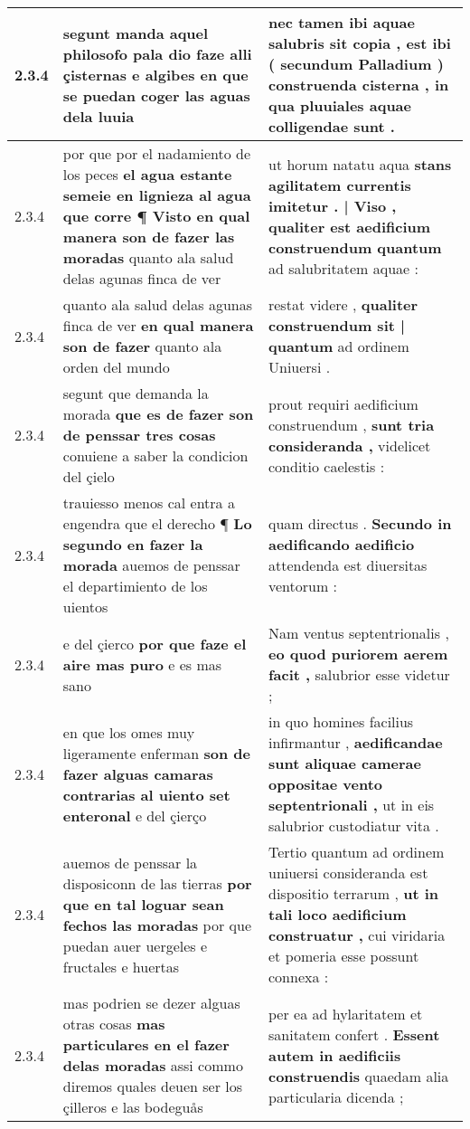 \begin{tabular}{|p{1cm}|p{6.5cm}|p{6.5cm}|}
2.3.4 & segunt manda aquel philosofo \textbf{ pala dio faze alli çisternas } e algibes en que se puedan coger las aguas dela luuia & nec tamen ibi aquae salubris sit copia , \textbf{ est ibi ( secundum Palladium ) construenda cisterna , } in qua pluuiales aquae colligendae sunt . \\\hline
2.3.4 & por que por el nadamiento de los peces \textbf{ el agua estante semeie en lignieza al agua que corre ¶ Visto en qual manera son de fazer las moradas } quanto ala salud delas agunas finca de ver & ut horum natatu aqua \textbf{ stans agilitatem currentis imitetur . | Viso , qualiter est aedificium construendum quantum } ad salubritatem aquae : \\\hline
2.3.4 & quanto ala salud delas agunas finca de ver \textbf{ en qual manera son de fazer } quanto ala orden del mundo & restat videre , \textbf{ qualiter construendum sit | quantum } ad ordinem Uniuersi . \\\hline
2.3.4 & segunt que demanda la morada \textbf{ que es de fazer son de penssar tres cosas } conuiene a saber la condicion del çielo & prout requiri aedificium construendum , \textbf{ sunt tria consideranda , } videlicet conditio caelestis : \\\hline
2.3.4 & trauiesso menos cal entra a engendra que el derecho ¶ \textbf{ Lo segundo en fazer la morada } auemos de penssar el departimiento de los uientos & quam directus . \textbf{ Secundo in aedificando aedificio } attendenda est diuersitas ventorum : \\\hline
2.3.4 & e del çierco \textbf{ por que faze el aire mas puro } e es mas sano & Nam ventus septentrionalis , \textbf{ eo quod puriorem aerem facit , } salubrior esse videtur ; \\\hline
2.3.4 & en que los omes muy ligeramente enferman \textbf{ son de fazer alguas camaras contrarias al uiento set enteronal } e del çierço & in quo homines facilius infirmantur , \textbf{ aedificandae sunt aliquae camerae oppositae vento septentrionali , } ut in eis salubrior custodiatur vita . \\\hline
2.3.4 & auemos de penssar la disposiconn de las tierras \textbf{ por que en tal loguar sean fechos las moradas } por que puedan auer uergeles e fructales e huertas & Tertio quantum ad ordinem uniuersi consideranda est dispositio terrarum , \textbf{ ut in tali loco aedificium construatur , } cui viridaria et pomeria esse possunt connexa : \\\hline
2.3.4 & mas podrien se dezer alguas otras cosas \textbf{ mas particulares en el fazer delas moradas } assi commo diremos quales deuen ser los çilleros e las bodeguås & per ea ad hylaritatem et sanitatem confert . \textbf{ Essent autem in aedificiis construendis } quaedam alia particularia dicenda ; \\\hline

\end{tabular}
